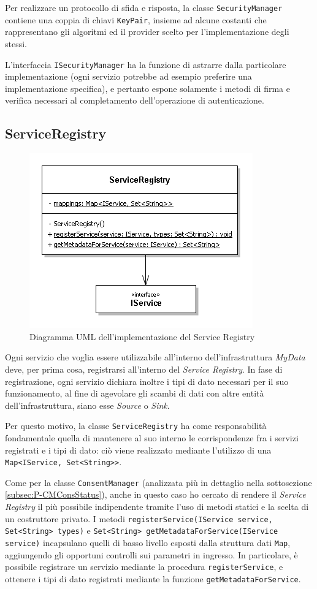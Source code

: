 Per realizzare un protocollo di sfida e risposta, la classe \texttt{SecurityManager} contiene una coppia di chiavi \texttt{KeyPair}, insieme ad alcune costanti che rappresentano gli algoritmi ed il provider scelto per l'implementazione degli stessi.

L'interfaccia \texttt{ISecurityManager} ha la funzione di astrarre dalla particolare implementazione (ogni servizio potrebbe ad esempio preferire una implementazione specifica), e pertanto espone solamente i metodi di firma e verifica necessari al completamento dell'operazione di autenticazione.

\subsection{ServiceRegistry}
\label{subsec:P-serviceregistry}
\begin{figure} [h]
	\centering
	\includegraphics[width=0.5\linewidth]{pictures/ServiceRegistry.png}
	\caption{Diagramma UML dell'implementazione del Service Registry}
	\label{fig:ServiceRegistry}
\end{figure}
Ogni servizio che voglia essere utilizzabile all’interno dell’infrastruttura \textit{MyData} deve, per prima cosa, registrarsi all’interno del \textit{Service Registry}. In fase di registrazione, ogni servizio dichiara inoltre i tipi di dato necessari per il suo funzionamento, al fine di agevolare gli scambi di dati con altre entit\`a dell’infrastruttura, siano esse \textit{Source} o \textit{Sink}.

Per questo motivo, la classe \texttt{ServiceRegistry} ha come responsabilit\`a fondamentale quella di mantenere al suo interno le corrispondenze fra i servizi registrati e i tipi di dato: ci\`o viene realizzato mediante l’utilizzo di una \texttt{Map<IService, Set<String>{}>}.

Come per la classe \texttt{ConsentManager} (analizzata pi\`u in dettaglio nella sottosezione \ref{subsec:P-CMConsStatus}), anche in questo caso ho cercato di rendere il \textit{Service Registry} il pi\`u possibile indipendente tramite l’uso di metodi statici e la scelta di un costruttore privato. I metodi \texttt{registerService(IService service, Set<String> types)} e \texttt{Set<String> getMetadataForService(IService service)} incapsulano quelli di basso livello esposti dalla struttura dati \texttt{Map}, aggiungendo gli opportuni controlli sui parametri in ingresso. In particolare, \`e possibile registrare un servizio mediante la procedura \texttt{registerService}, e ottenere i tipi di dato registrati mediante la funzione \texttt{getMetadataForService}.

